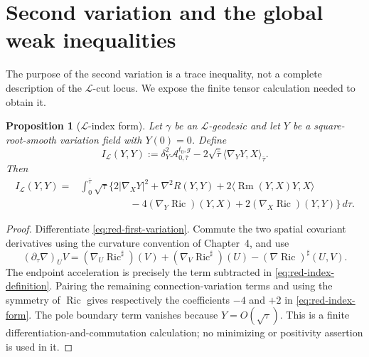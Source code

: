 \documentclass[10pt]{coll-l}
\newtheorem{proposition}[theorem]{Proposition}
\theoremstyle{definition}
\theoremstyle{remark}
\numberwithin{section}{chapter}
\numberwithin{equation}{chapter}
\newcommand{\Ric}{\operatorname{Ric}}
\newcommand{\Rm}{\operatorname{Rm}}
\begin{document}
\section{Second variation and the global weak inequalities}
\label{sec:red-weak}

The purpose of the second variation is a trace inequality, not a complete
description of the $\mathcal L$-cut locus.  We expose the finite tensor
calculation needed to obtain it.

\begin{proposition}[$\mathcal L$-index form]
\label{prop:red-index-form}
Let $\gamma$ be an $\mathcal L$-geodesic and let $Y$ be a square-root-smooth
variation field with $Y(0)=0$.  Define
\begin{equation}
 I_{\mathcal L}(Y,Y)
 :=\delta_Y^2\mathcal A^{t_0,g}_{0,\bar\tau}
   -2\sqrt{\bar\tau}\langle\nabla_YY,X\rangle_{\bar\tau}.
                                                               \label{eq:red-index-definition}
\end{equation}
Then
\begin{align}
 I_{\mathcal L}(Y,Y)
={}&\int_0^{\bar\tau}\sqrt\tau\bigl\{
 2|\nabla_XY|^2+\nabla^2R(Y,Y)
 +2\langle\Rm(Y,X)Y,X\rangle                         \label{eq:red-index-form}\\
 &\hspace{5em}-4(\nabla_Y\Ric)(Y,X)
 +2(\nabla_X\Ric)(Y,Y)\bigr\}\,d\tau .\nonumber
\end{align}
\end{proposition}

\begin{proof}
Differentiate \eqref{eq:red-first-variation}.  Commute the two spatial
covariant derivatives using the curvature convention of Chapter~4, and use
\begin{equation}
 (\partial_\tau\nabla)_UV
 =(\nabla_U\Ric^\sharp)(V)+(\nabla_V\Ric^\sharp)(U)
       -(\nabla\Ric)^\sharp(U,V).                       \label{eq:red-connection-variation}
\end{equation}
The endpoint acceleration is precisely the term subtracted in
\eqref{eq:red-index-definition}.  Pairing the remaining connection-variation
terms and using the symmetry of $\Ric$ gives respectively the coefficients
$-4$ and $+2$ in \eqref{eq:red-index-form}.  The pole boundary term vanishes
because $Y=O(\sqrt\tau)$.  This is a finite differentiation-and-commutation
calculation; no minimizing or positivity assertion is used in it.
\end{proof}
\end{document}
